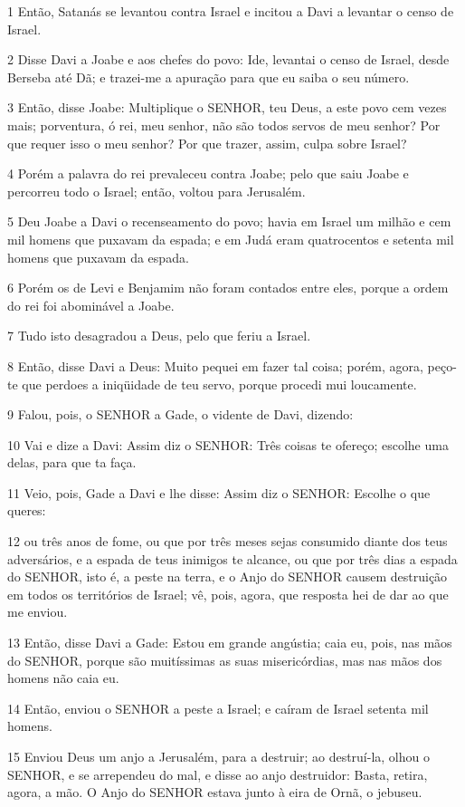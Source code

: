 \par 1 Então, Satanás se levantou contra Israel e incitou a Davi a levantar o censo de Israel.
\par 2 Disse Davi a Joabe e aos chefes do povo: Ide, levantai o censo de Israel, desde Berseba até Dã; e trazei-me a apuração para que eu saiba o seu número.
\par 3 Então, disse Joabe: Multiplique o SENHOR, teu Deus, a este povo cem vezes mais; porventura, ó rei, meu senhor, não são todos servos de meu senhor? Por que requer isso o meu senhor? Por que trazer, assim, culpa sobre Israel?
\par 4 Porém a palavra do rei prevaleceu contra Joabe; pelo que saiu Joabe e percorreu todo o Israel; então, voltou para Jerusalém.
\par 5 Deu Joabe a Davi o recenseamento do povo; havia em Israel um milhão e cem mil homens que puxavam da espada; e em Judá eram quatrocentos e setenta mil homens que puxavam da espada.
\par 6 Porém os de Levi e Benjamim não foram contados entre eles, porque a ordem do rei foi abominável a Joabe.
\par 7 Tudo isto desagradou a Deus, pelo que feriu a Israel.
\par 8 Então, disse Davi a Deus: Muito pequei em fazer tal coisa; porém, agora, peço-te que perdoes a iniqüidade de teu servo, porque procedi mui loucamente.
\par 9 Falou, pois, o SENHOR a Gade, o vidente de Davi, dizendo:
\par 10 Vai e dize a Davi: Assim diz o SENHOR: Três coisas te ofereço; escolhe uma delas, para que ta faça.
\par 11 Veio, pois, Gade a Davi e lhe disse: Assim diz o SENHOR: Escolhe o que queres:
\par 12 ou três anos de fome, ou que por três meses sejas consumido diante dos teus adversários, e a espada de teus inimigos te alcance, ou que por três dias a espada do SENHOR, isto é, a peste na terra, e o Anjo do SENHOR causem destruição em todos os territórios de Israel; vê, pois, agora, que resposta hei de dar ao que me enviou.
\par 13 Então, disse Davi a Gade: Estou em grande angústia; caia eu, pois, nas mãos do SENHOR, porque são muitíssimas as suas misericórdias, mas nas mãos dos homens não caia eu.
\par 14 Então, enviou o SENHOR a peste a Israel; e caíram de Israel setenta mil homens.
\par 15 Enviou Deus um anjo a Jerusalém, para a destruir; ao destruí-la, olhou o SENHOR, e se arrependeu do mal, e disse ao anjo destruidor: Basta, retira, agora, a mão. O Anjo do SENHOR estava junto à eira de Ornã, o jebuseu.
